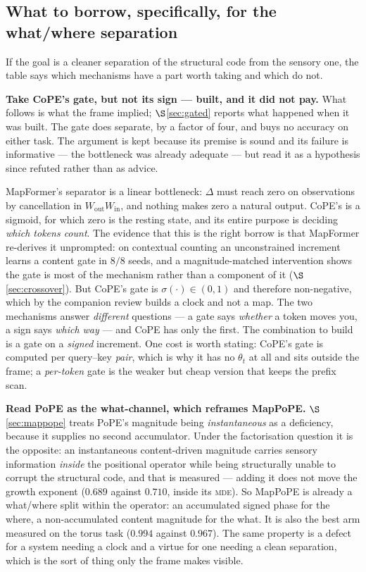 \documentclass[11pt]{article}
\begin{document}
\subsection{What to borrow, specifically, for the what/where separation}
\label{sec:borrow}

If the goal is a cleaner separation of the structural code from the sensory one,
the table says which mechanisms have a part worth taking and which do not.

\textbf{Take CoPE's gate, but not its sign --- built, and it did not pay.} What
follows is what the frame implied; $\S$\ref{sec:gated} reports what happened when it
was built. The gate does separate, by a factor of four, and buys no accuracy on
either task. The argument is kept because its premise is sound and its failure is
informative --- the bottleneck was already adequate --- but read it as a hypothesis
since refuted rather than as advice.

 MapFormer's separator is a linear
bottleneck: $\Delta$ must reach zero on observations by cancellation in
$W_{\mathrm{out}}W_{\mathrm{in}}$, and nothing makes zero a natural output. CoPE's
is a sigmoid, for which zero is the resting state, and its entire purpose is
deciding \emph{which tokens count}. The evidence that this is the right borrow is
that MapFormer re-derives it unprompted: on contextual counting an unconstrained
increment learns a content gate in $8/8$ seeds, and a magnitude-matched intervention
shows the gate is most of the mechanism rather than a component of it
($\S$\ref{sec:crossover}). But CoPE's gate is $\sigma(\cdot)\in(0,1)$ and therefore
non-negative, which by the companion review builds a clock and not a map. The two
mechanisms answer \emph{different} questions --- a gate says \emph{whether} a token
moves you, a sign says \emph{which way} --- and CoPE has only the first. The
combination to build is a gate on a \emph{signed} increment. One cost is worth
stating: CoPE's gate is computed per query--key \emph{pair}, which is why it has no
$\theta_t$ at all and sits outside the frame; a \emph{per-token} gate is the weaker
but cheap version that keeps the prefix scan.

\textbf{Read PoPE as the what-channel, which reframes MapPoPE.}
$\S$\ref{sec:mappope} treats PoPE's magnitude being \emph{instantaneous} as a
deficiency, because it supplies no second accumulator. Under the factorisation
question it is the opposite: an instantaneous content-driven magnitude carries
sensory information \emph{inside} the positional operator while being structurally
unable to corrupt the structural code, and that is measured --- adding it does not
move the growth exponent ($0.689$ against $0.710$, inside its \textsc{mde}). So
MapPoPE is already a what/where split within the operator: an accumulated signed
phase for the where, a non-accumulated content magnitude for the what. It is also
the best arm measured on the torus task ($0.994$ against $0.967$). The same property
is a defect for a system needing a clock and a virtue for one needing a clean
separation, which is the sort of thing only the frame makes visible.
\end{document}
